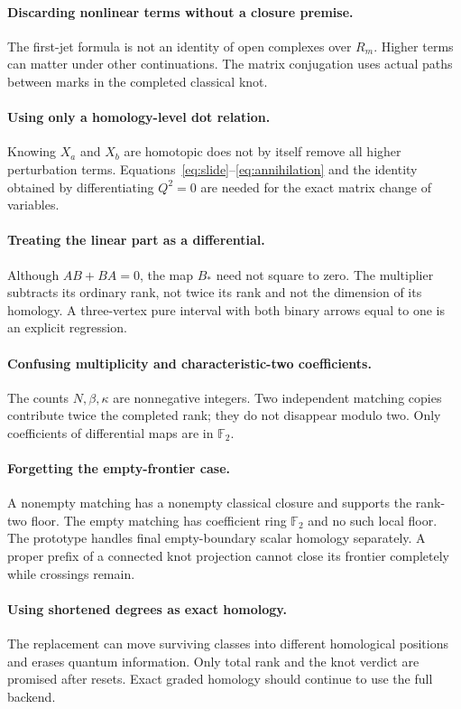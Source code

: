\documentclass[11pt]{article}
\theoremstyle{definition}\newtheorem{definition}[theorem]{Definition}\newtheorem{example}[theorem]{Example}
\theoremstyle{remark}\newtheorem{remark}[theorem]{Remark}
\newcommand{\F}{{\mathbb{F}_2}}
\begin{document}
\paragraph{Discarding nonlinear terms without a closure premise.}
The first-jet formula is not an identity of open complexes over $R_m$. Higher terms can matter under other continuations. The matrix conjugation uses actual paths between marks in the completed classical knot.

\paragraph{Using only a homology-level dot relation.}
Knowing $X_a$ and $X_b$ are homotopic does not by itself remove all higher perturbation terms. Equations~\eqref{eq:slide}--\eqref{eq:annihilation} and the identity obtained by differentiating $Q^2=0$ are needed for the exact matrix change of variables.

\paragraph{Treating the linear part as a differential.}
Although $AB+BA=0$, the map $B_*$ need not square to zero. The multiplier subtracts its ordinary rank, not twice its rank and not the dimension of its homology. A three-vertex pure interval with both binary arrows equal to one is an explicit regression.

\paragraph{Confusing multiplicity and characteristic-two coefficients.}
The counts $N,\beta,\kappa$ are nonnegative integers. Two independent matching copies contribute twice the completed rank; they do not disappear modulo two. Only coefficients of differential maps are in $\F$.

\paragraph{Forgetting the empty-frontier case.}
A nonempty matching has a nonempty classical closure and supports the rank-two floor. The empty matching has coefficient ring $\F$ and no such local floor. The prototype handles final empty-boundary scalar homology separately. A proper prefix of a connected knot projection cannot close its frontier completely while crossings remain.

\paragraph{Using shortened degrees as exact homology.}
The replacement can move surviving classes into different homological positions and erases quantum information. Only total rank and the knot verdict are promised after resets. Exact graded homology should continue to use the full backend.
\end{document}
